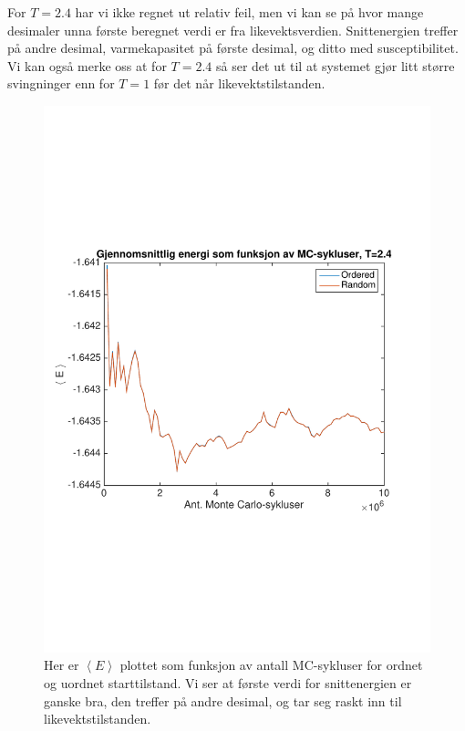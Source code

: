 \documentclass[norsk, 10pt]{article}
\def\mean#1{\left\langle #1 \right\rangle}
\begin{document}
For $T=2.4$ har vi ikke regnet ut relativ feil, men vi kan se på hvor mange desimaler unna første beregnet verdi er fra likevektsverdien. Snittenergien treffer på andre desimal, varmekapasitet på første desimal, og ditto med susceptibilitet. Vi kan også merke oss at for $T=2.4$ så ser det ut til at systemet gjør litt større svingninger enn for $T=1$ før det når likevektstilstanden.

\begin{figure}[H]
\centering
\includegraphics[scale = 0.6, trim = 1cm 8cm 1cm 8cm]{b_avgEnergy_MC_L2_T24.pdf}
\caption{Her er $\mean E$ plottet som funksjon av antall MC-sykluser for ordnet og uordnet starttilstand. Vi ser at første verdi for snittenergien er ganske bra, den treffer på andre desimal, og tar seg raskt inn til likevektstilstanden.}
\label{fig:meanET24}
\end{figure}
\end{document}

